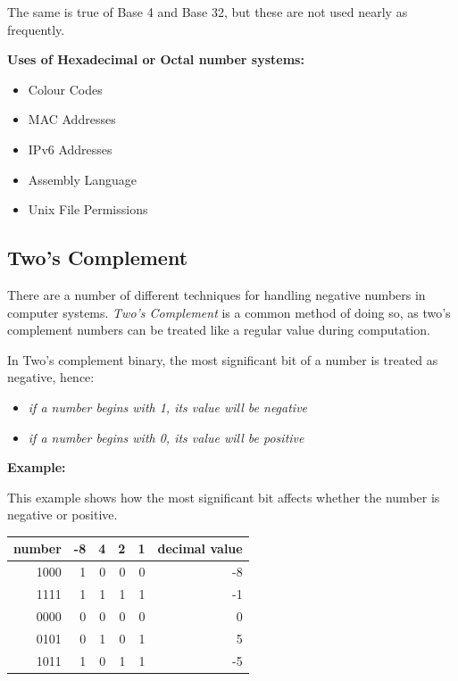 \documentclass[9pt]{article}
\begin{document}
The same is true of Base 4 and Base 32, but these are not used nearly as frequently.

\textbf{Uses of Hexadecimal or Octal number systems:}

\begin{itemize}
\item Colour Codes
\item MAC Addresses
\item IPv6 Addresses
\item Assembly Language
\item Unix File Permissions
\end{itemize}

\subsection{Two's Complement}
\label{sec:orge5ec277}

There are a number of different techniques for handling negative numbers in computer systems. \emph{Two's Complement} is a common method of doing so, as two's complement numbers can be treated like a regular value during computation.

In Two's complement binary, the most significant bit of a number is treated as negative, hence:

\begin{itemize}
\item \emph{if a number begins with 1, its value will be negative}
\item \emph{if a number begins with 0, its value will be positive}
\end{itemize}

\textbf{Example:}

This example shows how the most significant bit affects whether the number is negative or positive.

\begin{center}
\begin{tabular}{rrrrrr}
\hline
number & -8 & 4 & 2 & 1 & decimal value\\
\hline
1000 & 1 & 0 & 0 & 0 & -8\\
1111 & 1 & 1 & 1 & 1 & -1\\
0000 & 0 & 0 & 0 & 0 & 0\\
0101 & 0 & 1 & 0 & 1 & 5\\
1011 & 1 & 0 & 1 & 1 & -5\\
\hline
\end{tabular}
\end{center}
\end{document}
